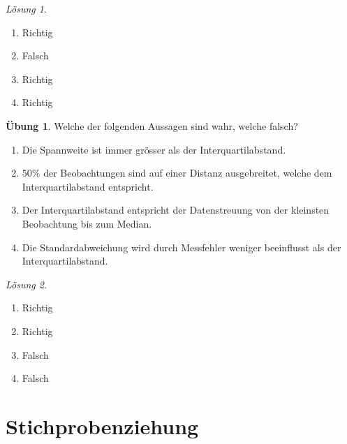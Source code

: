 \documentclass[
]{book}
\providecommand{\tightlist}{%
  \setlength{\itemsep}{0pt}\setlength{\parskip}{0pt}}
\theoremstyle{definition}
\theoremstyle{definition}
\theoremstyle{definition}
\newtheorem{exercise}{Übung}[chapter]
\theoremstyle{definition}
\theoremstyle{remark}
\newtheorem*{solution}{Lösung}
\begin{document}
\begin{solution}
\leavevmode

\begin{enumerate}
\def\labelenumi{\alph{enumi})}
\tightlist
\item
  Richtig
\item
  Falsch
\item
  Richtig
\item
  Richtig
\end{enumerate}

\end{solution}

\begin{exercise}
\leavevmode

Welche der folgenden Aussagen sind wahr, welche falsch?

\begin{enumerate}
\def\labelenumi{\alph{enumi})}
\tightlist
\item
  Die Spannweite ist immer grösser als der Interquartilabstand.
\item
  \(50\%\) der Beobachtungen sind auf einer Distanz ausgebreitet, welche dem Interquartilabstand entspricht.
\item
  Der Interquartilabstand entspricht der Datenstreuung von der kleinsten Beobachtung bis zum Median.
\item
  Die Standardabweichung wird durch Messfehler weniger beeinflusst als der Interquartilabstand.
\end{enumerate}

\end{exercise}

\begin{solution}
\leavevmode

\begin{enumerate}
\def\labelenumi{\alph{enumi})}
\tightlist
\item
  Richtig
\item
  Richtig
\item
  Falsch
\item
  Falsch
\end{enumerate}

\end{solution}

\chapter{Stichprobenziehung}\label{stichprobenziehung}
\end{document}
